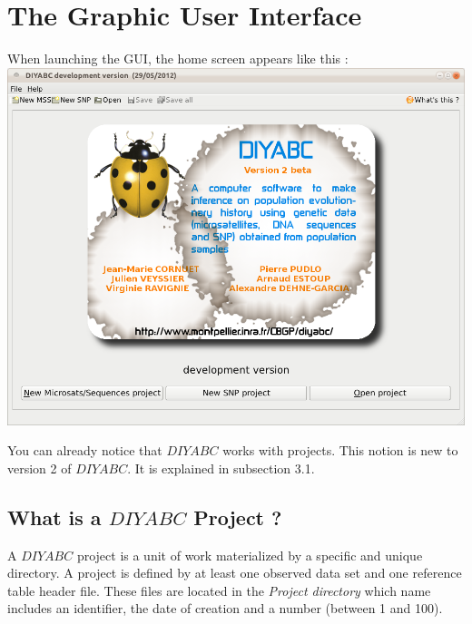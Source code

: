 \section{The Graphic User Interface}

When launching the GUI, the home screen appears like this :\\


\includegraphics[scale=0.4]{gui_pictures/Capture-DIYABC-1.png} 

You can already notice that $DIYABC$ works with projects. This notion is new to version 2 of $DIYABC$. It is explained in subsection 3.1.

\subsection{What is a $DIYABC$ Project ?}

\label{doc_openProjectButton}
A $DIYABC$ project is a unit of work materialized by a specific and unique directory. A project is defined by at least one observed data set and one reference table header file. These files are located in the \emph{Project directory} which name includes an identifier, the date of creation and a number (between 1 and 100).\\

